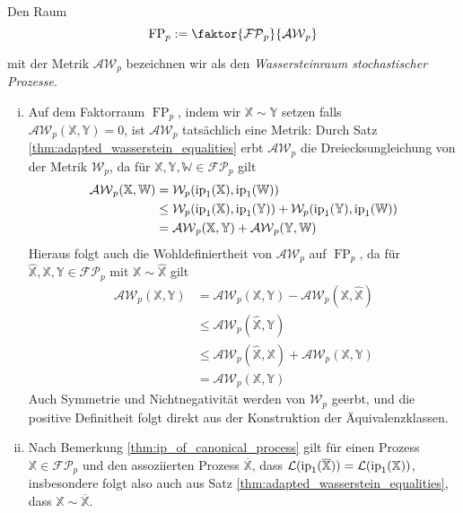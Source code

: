 \begin{definition}
    Den Raum
    $$\operatorname{FP}_p := \faktor{\mathcal{FP}_p}{\mathcal{AW}_p}$$

    mit der Metrik $\mathcal{AW}_p$ bezeichnen wir als den \emph{Wassersteinraum stochastischer Prozesse}.
\end{definition}
\begin{remark}
    \begin{enumerate}[(i)]
    \item Auf dem Faktorraum $\operatorname{FP}_p$, indem wir $\mathbb{X} \sim \mathbb{Y}$ setzen falls \\
     $\mathcal{AW}_p(\mathbb{X}, \mathbb{Y})=0$, ist $\mathcal{AW}_p$ tatsächlich eine Metrik: Durch Satz \ref{thm:adapted_wasserstein_equalities} erbt $\mathcal{AW}_p$ die Dreiecksungleichung von der Metrik $\mathcal{W}_p$, da für $\mathbb{X,Y,W} \in \mathcal{FP}_p$ gilt 
    \begin{align*}
        \mathcal{AW}_p(\mathbb{X,W}) &= \mathcal{W}_p(\operatorname{ip}_1(\mathbb{X}), \operatorname{ip}_1(\mathbb{W})) \\
        &\leq \mathcal{W}_p(\operatorname{ip}_1(\mathbb{X}), \operatorname{ip}_1(\mathbb{Y})) + \mathcal{W}_p(\operatorname{ip}_1(\mathbb{Y}), \operatorname{ip}_1(\mathbb{W})) \\
        &= \mathcal{AW}_p(\mathbb{X,Y}) + \mathcal{AW}_p(\mathbb{Y, W})
    \end{align*}
    Hieraus folgt auch die Wohldefiniertheit von $\mathcal{AW}_p$ auf $\operatorname{FP}_p$, da für $\hat{\mathbb{X}}, \mathbb{X,Y} \in \mathcal{FP}_p$ mit $\mathbb{X}\sim\hat{\mathbb{X}}$ gilt
    \begin{align*}
        \mathcal{AW}_p(\mathbb{X,Y}) &= \mathcal{AW}_p(\mathbb{X}, \mathbb{Y}) - \mathcal{AW}_p(\mathbb{X}, \hat{\mathbb{X}}) \\
        &\leq \mathcal{AW}_p(\hat{\mathbb{X}}, \mathbb{Y}) \\
        &\leq \mathcal{AW}_p(\hat{\mathbb{X}}, \mathbb{X}) + \mathcal{AW}_p(\mathbb{X,Y}) \\
        &= \mathcal{AW}_p(\mathbb{X,Y})
    \end{align*}
    Auch Symmetrie und Nichtnegativität werden von $\mathcal{W}_p$ geerbt, und die positive Definitheit folgt direkt aus der Konstruktion der Äquivalenzklassen.

    \item Nach Bemerkung \ref{thm:ip_of_canonical_process} gilt für einen Prozess $\mathbb{X} \in \mathcal{FP}_p$ und den assoziierten Prozess $\overline{\mathbb{X}}$, dass $\mathcal{L}(\operatorname{ip}_1(\overline{\mathbb{X}})) = \mathcal{L}(\operatorname{ip}_1(\mathbb{X}))$, insbesondere folgt also auch aus Satz \ref{thm:adapted_wasserstein_equalities}, dass $\mathbb{X} \sim \overline{\mathbb{X}}$.


\end{enumerate}
\end{remark}
